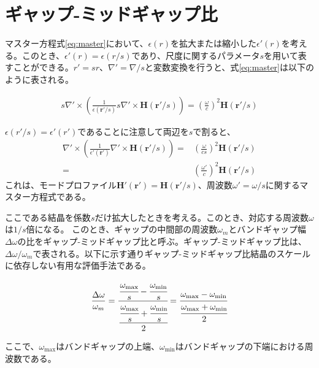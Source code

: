 \documentclass[platex,dvipdfmx,draft]{jsreport}
\numberwithin{equation}{section}
\begin{document}


\section{ギャップ-ミッドギャップ比}
マスター方程式\ref{eq:master}において、$\epsilon(r)$を拡大または縮小した$\epsilon'(r)$を考える。このとき、$\epsilon'(r) = \epsilon(r / s)$であり、尺度に関するパラメータ$s$を用いて表すことができる。$r' = sr$、$\nabla' = \nabla / s$と変数変換を行うと、式\ref{eq:master}は以下のように表される。

\begin{align}
  s \nabla' \times \left( \frac{1}{\epsilon(\bm{r}'/s)} s \nabla' \times \bm{H}(\bm{r}'/s) \right)
  = \left( \frac{\omega}{c} \right)^2 \bm{H}(\bm{r}'/s)
\end{align}

$\epsilon(r' / s) = \epsilon' (r')$であることに注意して両辺を$s$で割ると、
\begin{equation}
  \begin{split}
  \nabla' \times \left( \frac{1}{\epsilon'(\bm{r}')} \nabla' \times \bm{H}(\bm{r}' / s) \right) =& \left( \frac{\omega}{cs} \right)^2  \bm{H}(\bm{r}' / s)
  \\
  =& \left( \frac{\omega'}{c} \right)^2 \bm{H}(\bm{r}' / s)
\end{split}
\end{equation}
これは、モードプロファイル$\bm{H}'(\bm{r}') = \bm{H}(\bm{r}' / s)$、周波数$\omega' = \omega / s$に関するマスター方程式である。

ここである結晶を係数$s$だけ拡大したときを考える。このとき、対応する周波数$\omega$は$1 / s$倍になる。
このとき、ギャップの中間部の周波数$\omega_m$とバンドギャップ幅$\Delta \omega$の比をギャップ-ミッドギャップ比と呼ぶ。ギャップ-ミッドギャップ比は、$\Delta \omega / \omega_m$で表される。以下に示す通りギャップ-ミッドギャップ比結晶のスケールに依存しない有用な評価手法である。

\begin{align*}
  \frac{\Delta \omega}{\omega_m} 
  = \cfrac{\cfrac{\omega_{\mathrm{max}}}{s} - \cfrac{\omega_{\mathrm{min}}}{s}}{\cfrac{\cfrac{\omega_{\mathrm{max}}}{s} + \cfrac{\omega_{\mathrm{min}}}{s}}{2}} 
  = \cfrac{\omega_{\mathrm{max}} - \omega_{\mathrm{min}}}{\cfrac{\omega_{\mathrm{max}} + \omega_{\mathrm{min}}}{2}}
\end{align*}

ここで、$\omega_{\mathrm{max}}$はバンドギャップの上端、$\omega_{\mathrm{min}}$はバンドギャップの下端における周波数である。
\end{document}
